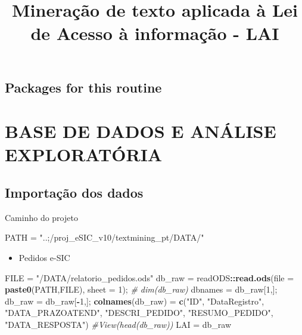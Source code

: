 \documentclass[]{article}
\title{Mineração de texto aplicada à Lei de Acesso à informação - LAI}
\author{}
\date{}
\newenvironment{Shaded}{\begin{snugshade}}{\end{snugshade}}
\newcommand{\KeywordTok}[1]{\textcolor[rgb]{0.13,0.29,0.53}{\textbf{#1}}}
\newcommand{\DataTypeTok}[1]{\textcolor[rgb]{0.13,0.29,0.53}{#1}}
\newcommand{\DecValTok}[1]{\textcolor[rgb]{0.00,0.00,0.81}{#1}}
\newcommand{\StringTok}[1]{\textcolor[rgb]{0.31,0.60,0.02}{#1}}
\newcommand{\CommentTok}[1]{\textcolor[rgb]{0.56,0.35,0.01}{\textit{#1}}}
\newcommand{\OperatorTok}[1]{\textcolor[rgb]{0.81,0.36,0.00}{\textbf{#1}}}
\newcommand{\NormalTok}[1]{#1}
\providecommand{\tightlist}{%
  \setlength{\itemsep}{0pt}\setlength{\parskip}{0pt}}
\begin{document}
\maketitle

\subsection{Packages for this routine}\label{packages-for-this-routine}

\section{BASE DE DADOS E ANÁLISE
EXPLORATÓRIA}\label{base-de-dados-e-analise-exploratoria}

\subsection{Importação dos dados}\label{importacao-dos-dados}

Caminho do projeto

\begin{Shaded}
\begin{Highlighting}[]
\NormalTok{PATH = }\StringTok{"..;/proj_eSIC_v10/textmining_pt/DATA/"}
\end{Highlighting}
\end{Shaded}

\begin{itemize}
\tightlist
\item
  Pedidos e-SIC
\end{itemize}

\begin{Shaded}
\begin{Highlighting}[]
\NormalTok{FILE =}\StringTok{ "/DATA/relatorio_pedidos.ods"}
\NormalTok{db_raw =}\StringTok{ }\NormalTok{readODS}\OperatorTok{::}\KeywordTok{read.ods}\NormalTok{(}\DataTypeTok{file =} \KeywordTok{paste0}\NormalTok{(PATH,FILE), }\DataTypeTok{sheet =} \DecValTok{1}\NormalTok{); }\CommentTok{# dim(db_raw)}
\NormalTok{dbnames =}\StringTok{ }\NormalTok{db_raw[}\DecValTok{1}\NormalTok{,]; db_raw =}\StringTok{ }\NormalTok{db_raw[}\OperatorTok{-}\DecValTok{1}\NormalTok{,]; }
\KeywordTok{colnames}\NormalTok{(db_raw) =}\StringTok{ }\KeywordTok{c}\NormalTok{(}\StringTok{"ID"}\NormalTok{, }\StringTok{"DataRegistro"}\NormalTok{, }\StringTok{"DATA_PRAZOATEND"}\NormalTok{, }\StringTok{"DESCRI_PEDIDO"}\NormalTok{,}
                     \StringTok{"RESUMO_PEDIDO"}\NormalTok{, }\StringTok{"DATA_RESPOSTA"}\NormalTok{)}
\CommentTok{#View(head(db_raw))}
\NormalTok{LAI =}\StringTok{ }\NormalTok{db_raw}
\end{Highlighting}
\end{Shaded}
\end{document}
